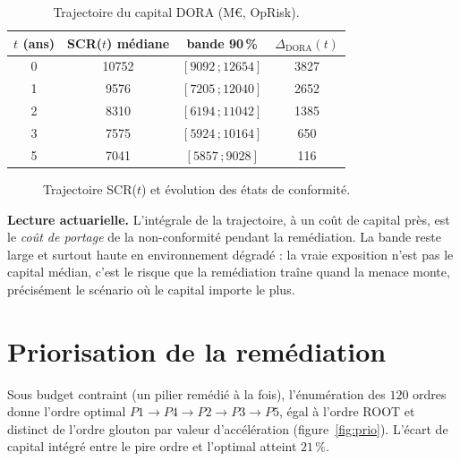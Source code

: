 \begin{table}[htbp]\centering\small
\renewcommand{\arraystretch}{1.2}
\begin{tabular}{@{}c ccc@{}}
\toprule
$t$ (ans) & SCR($t$) médiane & bande 90\,\% & $\Delta_{\text{DORA}}(t)$ \\
\midrule
0 & 10752 & $[9092\,;12654]$ & 3827 \\
1 & 9576  & $[7205\,;12040]$ & 2652 \\
2 & 8310  & $[6194\,;11042]$ & 1385 \\
3 & 7575  & $[5924\,;10164]$ & 650 \\
5 & 7041  & $[5857\,;9028]$  & 116 \\
\bottomrule
\end{tabular}
\caption{Trajectoire du capital DORA (M\euro, OpRisk).}
\label{tab:traj}
\end{table}

\begin{figure}[H]\centering
{}
\caption{Trajectoire SCR($t$) et évolution des états de conformité.}
\label{fig:traj}
\end{figure}

\noindent \textbf{Lecture actuarielle.} L'intégrale de la trajectoire, à un coût de capital
près, est le \emph{coût de portage} de la non-conformité pendant la remédiation. La bande reste
large et surtout haute en environnement dégradé : la vraie exposition n'est pas le capital
médian, c'est le risque que la remédiation traîne quand la menace monte, précisément le scénario
où le capital importe le plus.

\section{Priorisation de la remédiation}

Sous budget contraint (un pilier remédié à la fois), l'énumération des $120$ ordres donne
l'ordre optimal $P1\to P4\to P2\to P3\to P5$, égal à l'ordre ROOT et distinct de l'ordre
glouton par valeur d'accélération (figure~\ref{fig:prio}). L'écart de capital intégré entre le
pire ordre et l'optimal atteint $21\,\%$.

